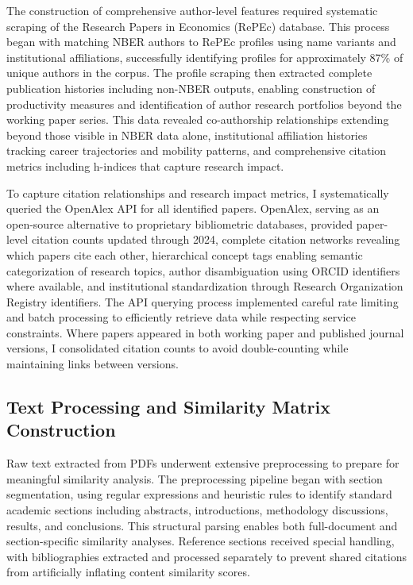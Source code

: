 \documentclass[12pt]{article}
\begin{document}
The construction of comprehensive author-level features required systematic scraping of the Research Papers in Economics (RePEc) database. This process began with matching NBER authors to RePEc profiles using name variants and institutional affiliations, successfully identifying profiles for approximately 87\% of unique authors in the corpus. The profile scraping then extracted complete publication histories including non-NBER outputs, enabling construction of productivity measures and identification of author research portfolios beyond the working paper series. This data revealed co-authorship relationships extending beyond those visible in NBER data alone, institutional affiliation histories tracking career trajectories and mobility patterns, and comprehensive citation metrics including h-indices that capture research impact.

To capture citation relationships and research impact metrics, I systematically queried the OpenAlex API for all identified papers. OpenAlex, serving as an open-source alternative to proprietary bibliometric databases, provided paper-level citation counts updated through 2024, complete citation networks revealing which papers cite each other, hierarchical concept tags enabling semantic categorization of research topics, author disambiguation using ORCID identifiers where available, and institutional standardization through Research Organization Registry identifiers. The API querying process implemented careful rate limiting and batch processing to efficiently retrieve data while respecting service constraints. Where papers appeared in both working paper and published journal versions, I consolidated citation counts to avoid double-counting while maintaining links between versions.

\subsection{Text Processing and Similarity Matrix Construction}

Raw text extracted from PDFs underwent extensive preprocessing to prepare for meaningful similarity analysis. The preprocessing pipeline began with section segmentation, using regular expressions and heuristic rules to identify standard academic sections including abstracts, introductions, methodology discussions, results, and conclusions. This structural parsing enables both full-document and section-specific similarity analyses. Reference sections received special handling, with bibliographies extracted and processed separately to prevent shared citations from artificially inflating content similarity scores.
\end{document}
